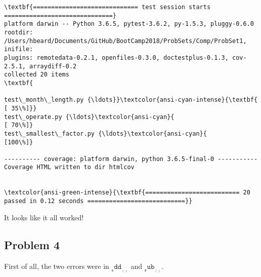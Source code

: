 \documentclass[11pt]{article}
\begin{document}
    \begin{Verbatim}[commandchars=\\\{\}]
\textbf{============================= test session starts ==============================}
platform darwin -- Python 3.6.5, pytest-3.6.2, py-1.5.3, pluggy-0.6.0
rootdir: /Users/hbeard/Documents/GitHub/BootCamp2018/ProbSets/Comp/ProbSet1, inifile:
plugins: remotedata-0.2.1, openfiles-0.3.0, doctestplus-0.1.3, cov-2.5.1, arraydiff-0.2
collected 20 items                                                             \textbf{

test\_month\_length.py {\ldots}}\textcolor{ansi-cyan-intense}{\textbf{                                             [ 35\%]}}
test\_operate.py {\ldots}\textcolor{ansi-cyan}{                                                  [ 70\%]}
test\_smallest\_factor.py {\ldots}\textcolor{ansi-cyan}{                                           [100\%]}

---------- coverage: platform darwin, python 3.6.5-final-0 -----------
Coverage HTML written to dir htmlcov


\textcolor{ansi-green-intense}{\textbf{========================== 20 passed in 0.12 seconds ===========================}}

    \end{Verbatim}

    It looks like it all worked!

    \subsection{Problem 4}\label{problem-4}

    First of all, the two errors were in \(\mathtt{__add__()}\) and
\(\mathtt{__sub__()}\).
\end{document}
